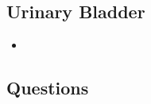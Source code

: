 \subsection{Urinary Bladder}
\begin{multicols}{2}
\begin{itemize}
  \item 
\end{itemize}
\end{multicols}

\subsection{Questions}
\begin{itemize}
\end{itemize}